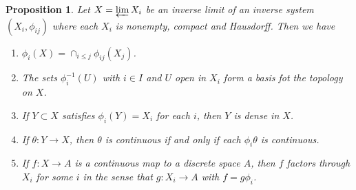 \documentclass[12pt]{report}
\newtheorem{proposition}[theorem]{Proposition}
{\theoremstyle{remark}\newtheorem*{remark}{Remark}}
\theoremstyle{definition}
\begin{document}
\begin{proposition}\label{27.7}
	Let $X=\varprojlim X_i$ be an inverse limit of an inverse system $(X_i,\phi_{ij})$ where each $X_i$ is nonempty, compact and Hausdorff. Then we have
	\begin{enumerate}
		\item $\phi_i(X)=\cap_{i\leq j}\phi_{ij}(X_j)$.
		\item The sets $\phi_i^{-1}(U)$ with $i\in I$ and $U$ open in $X_i$ form a basis fot the topology on $X$.
		\item If $Y\subset X$ satisfies $\phi_i(Y)=X_i$ for each $i$, then $Y$ is dense in $X$.
		\item If $\theta:Y\to X$, then $\theta$ is continuous if and only if each $\phi_i\theta$ is continuous.
		\item If $f:X\to A$ is a continuous map to a discrete space $A$, then $f$ factors through $X_i$ for some $i$ in the sense that $g:X_i\to A$ with $f=g\phi_i$.
	\end{enumerate}
\end{proposition}
\end{document}
